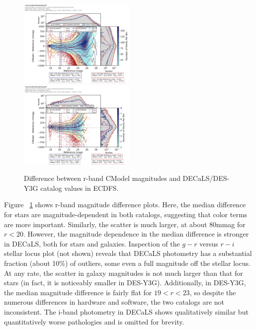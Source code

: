 \begin{figure}
  \includegraphics[width=0.5\textwidth]{galaxy_photometry/cdfs_r_vs_DECaLS.png}
  \includegraphics[width=0.5\textwidth]{galaxy_photometry/cdfs_r_vs_desy3g.png}
\caption{Difference between r-band CModel magnitudes and DECaLS/DES-Y3G catalog values in ECDFS.}
  \label{fig:cdfs_r_vs_des}
\end{figure}

Figure ~\ref{fig:cdfs_r_vs_des} shows r-band magnitude difference plots.
Here, the median difference for stars are magnitude-dependent in both catalogs, suggesting that color terms are more important.
Similarly, the scatter is much larger, at about 80mmag for $r < 20$.
However, the magnitude dependence in the median difference is stronger in DECaLS, both for stars and galaxies.
Inspection of the $g-r$ versus $r-i$ stellar locus plot (not shown) reveals that DECaLS photometry has a substantial fraction (about 10\%) of outliers, some even a full magnitude off the stellar locus.
At any rate, the scatter in galaxy magnitudes is not much larger than that for stars (in fact, it is noticeably smaller in DES-Y3G).
Additionally, in DES-Y3G, the median magnitude difference is fairly flat for $19<r<23$, so despite the numerous differences in hardware and software, the two catalogs are not inconsistent.
The i-band photometry in DECaLS shows qualitatively similar but quantitatively worse pathologies and is omitted for brevity.

